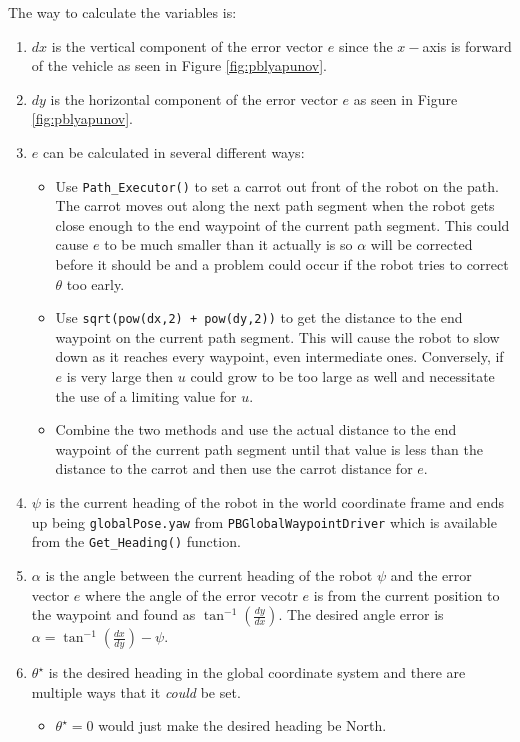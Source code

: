 \documentclass[12pt]{article}
\begin{document}
The way to calculate the variables is:
\begin{enumerate}
\item $dx$ is the vertical component of the error vector $e$ since the $x-$axis is forward of the vehicle as seen in Figure \ref{fig:pblyapunov}.
\item $dy$ is the horizontal component of the error vector $e$ as seen in Figure \ref{fig:pblyapunov}.
\item $e$ can be calculated in several different ways:
\begin{itemize}
\item Use \texttt{Path\_Executor()} to set a carrot out front of the robot on the path. The carrot moves out along the next path segment when the robot gets close enough to the end waypoint of the current path segment. This could cause $e$ to be much smaller than it actually is so $\alpha$ will be corrected before it should be and a problem could occur if the robot tries to correct $\theta$ too early.
\item Use \texttt{sqrt(pow(dx,2) + pow(dy,2))} to get the distance to the end waypoint on the current path segment. This will cause the robot to slow down as it reaches every waypoint, even intermediate ones. Conversely, if $e$ is very large then $u$ could grow to be too large as well and necessitate the use of a limiting value for $u$.
\item Combine the two methods and use the actual distance to the end waypoint of the current path segment until that value is less than the distance to the carrot and then use the carrot distance for $e$.
\end{itemize}
\item $\psi$ is the current heading of the robot in the world coordinate frame and ends up being \texttt{globalPose.yaw} from \texttt{PBGlobalWaypointDriver} which is available from the \texttt{Get\_Heading()} function.
\item $\alpha$ is the angle between the current heading of the robot $\psi$ and the error vector $e$ where the angle of the error vecotr $e$ is from the current position to the waypoint and found as $\tan^{-1}\left(\frac{dy}{dx}\right)$. The desired angle error is $\alpha = \tan^{-1}\left(\frac{dx}{dy}\right) - \psi$.
\item $\theta^\star$ is the desired heading in the global coordinate system and there are multiple ways that it \textit{could} be set.
\begin{itemize}
\item $\theta^\star=0$ would just make the desired heading be North.

\end{itemize}
\end{enumerate}
\end{document}
